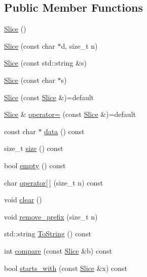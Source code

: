 \subsection*{Public Member Functions}
\begin{DoxyCompactItemize}
\item 
\mbox{\hyperlink{classleveldb_1_1_slice_a5a57e9733fb783aceec1aecfe068ad85}{Slice}} ()
\item 
\mbox{\hyperlink{classleveldb_1_1_slice_ae77bd1d4353bd94d768474d467657c85}{Slice}} (const char $\ast$d, size\+\_\+t n)
\item 
\mbox{\hyperlink{classleveldb_1_1_slice_ab79b60f33aa094179fe36880bc220853}{Slice}} (const std\+::string \&s)
\item 
\mbox{\hyperlink{classleveldb_1_1_slice_a429c530560405fe1a7cd745f7afecf5a}{Slice}} (const char $\ast$s)
\item 
\mbox{\hyperlink{classleveldb_1_1_slice_a53cdde237c653292d361e92bc0f25229}{Slice}} (const \mbox{\hyperlink{classleveldb_1_1_slice}{Slice}} \&)=default
\item 
\mbox{\hyperlink{classleveldb_1_1_slice}{Slice}} \& \mbox{\hyperlink{classleveldb_1_1_slice_aed082a8f2d4a877058f5bac84effaac1}{operator=}} (const \mbox{\hyperlink{classleveldb_1_1_slice}{Slice}} \&)=default
\item 
const char $\ast$ \mbox{\hyperlink{classleveldb_1_1_slice_a94ccee3d05b66ba0b059f2d9772b782b}{data}} () const
\item 
size\+\_\+t \mbox{\hyperlink{classleveldb_1_1_slice_a7344120beda110de81d0c45d4cfe4b63}{size}} () const
\item 
bool \mbox{\hyperlink{classleveldb_1_1_slice_a56ac7a70125c26187ecf4dd040004582}{empty}} () const
\item 
char \mbox{\hyperlink{classleveldb_1_1_slice_aea62da83ffa80f22e065b15ca8596726}{operator\mbox{[}$\,$\mbox{]}}} (size\+\_\+t n) const
\item 
void \mbox{\hyperlink{classleveldb_1_1_slice_ab9b6e340e8a483a5cf713f6be17709e3}{clear}} ()
\item 
void \mbox{\hyperlink{classleveldb_1_1_slice_a1be5b22958a115ebecb2b017aad2b3f6}{remove\+\_\+prefix}} (size\+\_\+t n)
\item 
std\+::string \mbox{\hyperlink{classleveldb_1_1_slice_a10ab05e2c2358bb6e6b6d49bf69d72ce}{To\+String}} () const
\item 
int \mbox{\hyperlink{classleveldb_1_1_slice_a1ec69137e5cee9ef34c5c4fca3c62957}{compare}} (const \mbox{\hyperlink{classleveldb_1_1_slice}{Slice}} \&b) const
\item 
bool \mbox{\hyperlink{classleveldb_1_1_slice_ae1c0a7f51a18a83bbeebfb300bf23767}{starts\+\_\+with}} (const \mbox{\hyperlink{classleveldb_1_1_slice}{Slice}} \&x) const
\end{DoxyCompactItemize}


